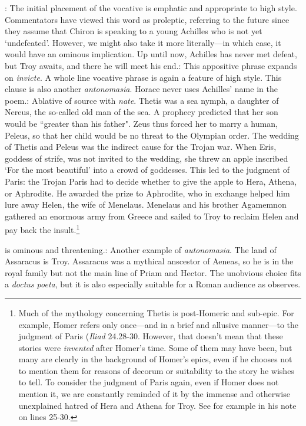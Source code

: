 
: The initial placement of the vocative is emphatic and appropriate to high style.  Commentators have viewed this word as proleptic, referring to the future since they assume that Chiron is speaking to a young Achilles who is not yet `undefeated'.  However, we might also take it more literally---in which case, it would have an ominous implication.  Up until now, Achilles has never met defeat, but Troy awaits, and there he will meet his end.\indent{}: This appositive phrase expands on \textit{invicte}.  A whole line vocative phrase is again a feature of high style.  This clause is also another \textit{antonomasia}.  Horace never uses Achilles' name in the poem.\indent{}: Ablative of source with \textit{nate}.  Thetis was a sea nymph, a daughter of Nereus, the so-called old man of the sea.   A prophecy predicted that her son would be ``greater than his father".  Zeus thus forced her to marry a human, Peleus, so that her child would be no threat to the Olympian order.  The wedding of Thetis and Peleus was the indirect cause for the Trojan war.  When Eris, goddess of strife, was not invited to the wedding, she threw an apple inscribed `For the most beautiful' into a crowd of goddesses.  This led to the judgment of Paris: the Trojan Paris had to decide whether to give the apple to Hera, Athena, or Aphrodite.  He awarded the prize to Aphrodite, who in exchange helped him lure away Helen, the wife of Menelaus.  Menelaus and his brother Agamemnon gathered an enormous army from Greece and sailed to Troy to reclaim Helen and pay back the insult.\footnote{Much of the mythology concerning Thetis is post-Homeric and sub-epic.  For example, Homer refers only once---and in a brief and allusive manner---to the judgment of Paris (\textit{Iliad} 24.28-30.  However, that doesn't mean that these stories were \textit{invented} after Homer's time.  Some of them may have been, but many are clearly in the background of Homer's epics, even if he chooses not to mention them for reasons of decorum or suitability to the story he wishes to tell.  To consider the judgment of Paris again, even if Homer does not mention it, we are constantly reminded of it by the immense and otherwise unexplained hatred of Hera and Athena for Troy.  See for example \citet[88]{macleod1982} in his note on lines 25-30.}


 is ominous and threatening.\indent{}: Another example of \textit{autonomasia}.  The land of Assaracus is Troy. Assaracus was a mythical anscestor of Aeneas, so he is in the royal family but not the main line of Priam and Hector.  The unobvious choice fits a \textit{doctus poeta}, but it is also especially suitable for a Roman audience as \citet[223]{mankin1995} observes.

